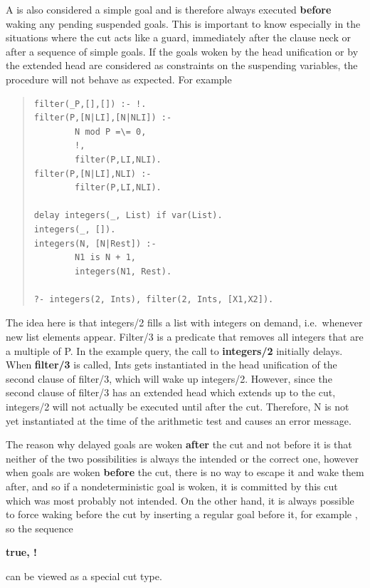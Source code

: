 A
is also considered a simple goal and is therefore
always executed {\bf before} waking any pending suspended goals.
This is important to know especially in the situations where the cut
acts like a guard, immediately after the clause neck or after
a sequence of simple goals.
If the goals woken by the head unification or by the extended head
are considered as constraints on the suspending variables,
the procedure will not behave as expected.
For example
\begin{quote}
\begin{verbatim}
filter(_P,[],[]) :- !.
filter(P,[N|LI],[N|NLI]) :-
        N mod P =\= 0,
        !,
        filter(P,LI,NLI).
filter(P,[N|LI],NLI) :-
        filter(P,LI,NLI).

delay integers(_, List) if var(List).
integers(_, []).
integers(N, [N|Rest]) :-
        N1 is N + 1,
        integers(N1, Rest).
 
?- integers(2, Ints), filter(2, Ints, [X1,X2]).
\end{verbatim}
\end{quote}
The idea here is that integers/2 fills a list with integers on demand,
i.e.\ whenever new list elements appear.
Filter/3 is a predicate that removes all integers that are a multiple
of P. In the example query, the call to {\bf integers/2} initially delays.
When {\bf filter/3} is called, Ints gets instantiated in the head unification
of the second clause of filter/3, which will wake up integers/2. However,
since the second clause of filter/3 has an extended head which extends up to
the cut, integers/2 will not actually be executed until after the cut.
Therefore, N is not yet instantiated at the time of the arithmetic test
and causes an error message.
 
The reason why delayed goals are woken {\bf after} the cut and not before
it is that neither of the two possibilities is always the intended
or the correct one, however when goals are woken {\bf before} the cut,
there is no way to escape it and wake them after, and so if
a nondeterministic goal is woken, it is committed by this cut
which was most probably not intended.
On the other hand, it is always possible to force waking before the cut
by inserting a regular goal before it, for example ,
so the sequence
\begin{center}
{\bf true, !}
\end{center}
can be viewed as a special cut type.
 
